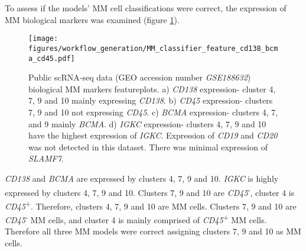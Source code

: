 To assess if the models' MM cell classifications were correct, the expression of MM biological markers was examined (figure \ref{fig:mm_class_ftp_cd138_cd45_bcma}).
\begin{figure}[htb]
\centering
\texttt{[image: figures/workflow\_generation/MM\_classifier\_feature\_cd138\_bcma\_cd45.pdf]}
\caption[Public scRNA-seq data bioligical MM markers featureplots]{Public scRNA-seq data (GEO accession number \textit{GSE188632}) biological MM markers featureplots.
a) \textit{CD138} expression- cluster 4, 7, 9 and 10 mainly expressing \textit{CD138}.
b) \textit{CD45} expression- clusters 7, 9 and 10 not expressing \textit{CD45}.
c) \textit{BCMA} expression- clusters 4, 7, and 9 mainly \textit{BCMA}.
d) \textit{IGKC} expression- clusters 4, 7, 9 and 10 have the highest expression of \textit{IGKC}.
Expression of \textit{CD19} and \textit{CD20} was not detected in this dataset.
There was minimal expression of \textit{SLAMF7}.
}
\label{fig:mm_class_ftp_cd138_cd45_bcma}
\end{figure}
%
\textit{CD138} and \textit{BCMA} are expressed by clusters 4, 7, 9 and 10.
\textit{IGKC} is highly expressed by clusters 4, 7, 9 and 10.
Clusters 7, 9 and 10 are \textit{CD45}\textsuperscript{-}, cluster 4 is \textit{CD45}\textsuperscript{+}.
Therefore, clusters 4, 7, 9 and 10 are MM cells.
Clusters 7, 9 and 10 are \textit{CD45}\textsuperscript{-} MM cells, and cluster 4 is mainly comprised of \textit{CD45}\textsuperscript{+} MM cells.
Therefore all three MM models were correct assigning clusters 7, 9 and 10 as MM cells.

